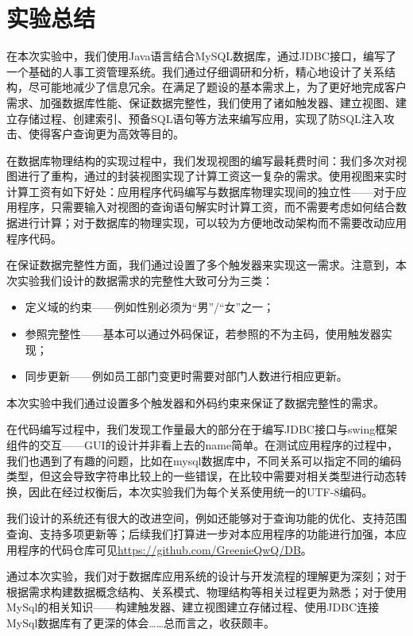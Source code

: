 \documentclass[withoutpreface,bwprint]{cumcmthesis} %
\begin{document}
\section{实验总结}
在本次实验中，我们使用Java语言结合MySQL数据库，通过JDBC接口，编写了一个基础的人事工资管理系统。我们通过仔细调研和分析，精心地设计了关系结构，尽可能地减少了信息冗余。在满足了题设的基本需求上，为了更好地完成客户需求、加强数据库性能、保证数据完整性，我们使用了诸如触发器、建立视图、建立存储过程、创建索引、预备SQL语句等方法来编写应用，实现了防SQL注入攻击、使得客户查询更为高效等目的。


在数据库物理结构的实现过程中，我们发现视图的编写最耗费时间：我们多次对视图进行了重构，通过的封装视图实现了计算工资这一复杂的需求。使用视图来实时计算工资有如下好处：应用程序代码编写与数据库物理实现间的独立性——对于应用程序，只需要输入对视图的查询语句解实时计算工资，而不需要考虑如何结合数据进行计算；对于数据库的物理实现，可以较为方便地改动架构而不需要改动应用程序代码。

在保证数据完整性方面，我们通过设置了多个触发器来实现这一需求。注意到，本次实验我们设计的数据需求的完整性大致可分为三类：
\begin{itemize}
\item 定义域的约束——例如性别必须为“男”/“女”之一；
\item 参照完整性——基本可以通过外码保证，若参照的不为主码，使用触发器实现；
\item 同步更新——例如员工部门变更时需要对部门人数进行相应更新。
\end{itemize}
本次实验中我们通过设置多个触发器和外码约束来保证了数据完整性的需求。


在代码编写过程中，我们发现工作量最大的部分在于编写JDBC接口与swing框架组件的交互——GUI的设计并非看上去的name简单。在测试应用程序的过程中，我们也遇到了有趣的问题，比如在mysql数据库中，不同关系可以指定不同的编码类型，但这会导致字符串比较上的一些错误，在比较中需要对相关类型进行动态转换，因此在经过权衡后，本次实验我们为每个关系使用统一的UTF-8编码。
 
我们设计的系统还有很大的改进空间，例如还能够对于查询功能的优化、支持范围查询、支持多项更新等；后续我们打算进一步对本应用程序的功能进行加强，本应用程序的代码仓库可见\url{https://github.com/GreenieQwQ/DB}。


通过本次实验，我们对于数据库应用系统的设计与开发流程的理解更为深刻；对于根据需求构建数据概念结构、关系模式、物理结构等相关过程更为熟悉；对于使用MySql的相关知识——构建触发器、建立视图建立存储过程、使用JDBC连接MySql数据库有了更深的体会……总而言之，收获颇丰。
\end{document}
